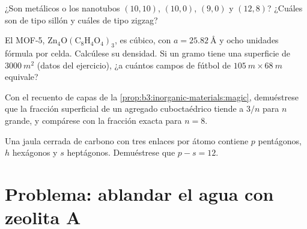 \begin{exercise}[$\star\star$]\label{exo:b3:inorganic-materials:9}
¿Son metálicos o  los nanotubos $(10, 10)$, $(10, 0)$, $(9, 0)$ y $(12, 8)$? ¿Cuáles
son de tipo sillón y cuáles de tipo zigzag?
\end{exercise}

\begin{exercise}[$\star\star\star$]\label{exo:b3:inorganic-materials:10}
El MOF-5, $\mathrm{Zn_4O(C_8H_4O_4)_3}$, es cúbico, con $a = \qty{25.82}{\angstrom}$ y ocho unidades fórmula por celda.
Calcúlese su densidad. Si un gramo tiene una superficie de $\qty{3000}{m^2}$ (datos del
ejercicio), ¿a cuántos campos de fútbol de $\qty{105}{m} \times \qty{68}{m}$ equivale?
\end{exercise}

\begin{exercise}[$\star\star\star$]\label{exo:b3:inorganic-materials:11}
Con el recuento de capas de la \cref{prop:b3:inorganic-materials:magic}, demuéstrese que la
fracción superficial de un agregado cuboctaédrico tiende a $3/n$ para $n$ grande, y
compárese con la fracción exacta para $n = 8$.
\end{exercise}

\begin{exercise}[$\star\star\star$]\label{exo:b3:inorganic-materials:12}
Una jaula cerrada de carbono con tres enlaces por átomo contiene $p$ pentágonos, $h$ hexágonos
y $s$ heptágonos. Demuéstrese que $p - s = 12$.
\end{exercise}

\section{Problema: ablandar el agua con zeolita A}

